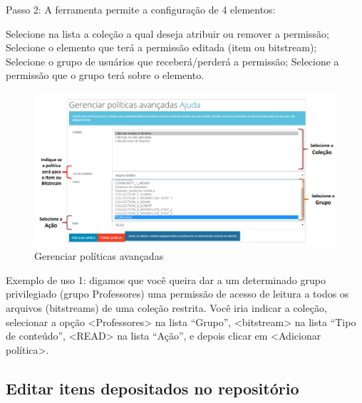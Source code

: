\documentclass[12pt,hidelinks]{article}
\begin{document}
    \singlespacing
    
    Passo 2: A ferramenta permite a configuração de 4 elementos:
    
    \singlespacing
    
    \textbullet \hspace{6pt} Selecione na lista a coleção a qual deseja atribuir ou remover a permissão; \\
    \textbullet \hspace{6pt} Selecione o elemento que terá a permissão editada (item ou bitstream); \\
    \textbullet \hspace{6pt} Selecione o grupo de usuários que receberá/perderá a permissão; 
    \textbullet \hspace{6pt} Selecione a permissão que o grupo terá sobre o elemento.
    
    \begin{figure}[!htp]
                \centering
                \includegraphics[scale=0.6]{figura/Figura84.png}
                \caption{Gerenciar políticas avançadas}
            \label{Rotulo}
        \end{figure}
    
\newpage
    
    Exemplo de uso 1: digamos que você queira dar a um determinado grupo privilegiado (grupo Professores) uma permissão de acesso de leitura a todos os arquivos (bitstreams) de uma coleção restrita. Você iria indicar a coleção, selecionar a opção <Professores> na lista “Grupo”, <bitstream> na lista “Tipo de conteúdo”, <READ> na lista “Ação”, e depois clicar em <Adicionar política>.
    
    \subsection{Editar itens depositados no repositório}
    
\end{document}

